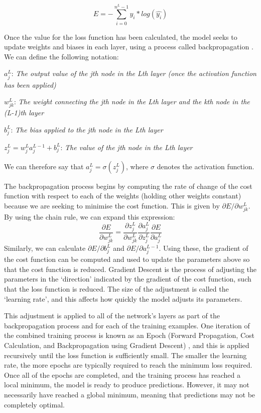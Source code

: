 $$E = -\sum_{i=0}^{n^L-1} y_i*log(\hat{y_i})$$

Once the value for the loss function has been calculated, the model seeks to update weights and biases in each layer, using a process called backpropagation \citep{Rumelhart, maths2015Nielsen}. We can define the following notation:

$a_j^L$: \textit{The output value of the jth node in the Lth layer (once the activation function has been applied)}

$w_{jk}^L$: \textit{The weight connecting the jth node in the Lth layer and the kth node in the (L-1)th layer}

$b_j^L$: \textit{The bias applied to the jth node in the Lth layer}

$z_j^L = w_j^L a_j^{L-1} + b_j^L$: \textit{The value of the jth node in the Lth layer}

We can therefore say that $a_j^L = \sigma(z_j^L)$, where $\sigma$ denotes the activation function.

The backpropagation process begins by computing the rate of change of the cost function with respect to each of the weights (holding other weights constant) because we are seeking to minimise the cost function. This is given by $\partial E/ \partial w_{jk}^L$.
By using the chain rule, we can expand this expression:
$$\frac{\partial E}{\partial w_{jk}^L} = \frac{\partial z_j^L}{\partial w_{jk}^L} \frac{\partial a_j^L}{\partial z_j^L} \frac{\partial E}{\partial a_j^L}$$ %
Similarly, we can calculate $\partial E/ \partial b_j^L$ and $\partial E/ \partial a_j^{L-1}$. Using these, the gradient of the cost function can be computed and used to update the parameters above so that the cost function is reduced. Gradient Descent is the process of adjusting the parameters in the `direction' indicated by the gradient of the cost function, such that the loss function is reduced. The size of the adjustment is called the `learning rate', and this affects how quickly the model adjusts its parameters.

This adjustment is applied to all of the network's layers as part of the backpropagation process and for each of the training examples. One iteration of the combined training process is known as an Epoch (Forward Propagation, Cost Calculation, and Backpropagation using Gradient Descent) \citep{Sharma}, and this is applied recursively until the loss function is sufficiently small. The smaller the learning rate, the more epochs are typically required to reach the minimum loss required. Once all of the epochs are completed, and the training process has reached a local minimum, the model is ready to produce predictions. However, it may not necessarily have reached a global minimum, meaning that predictions may not be completely optimal.

